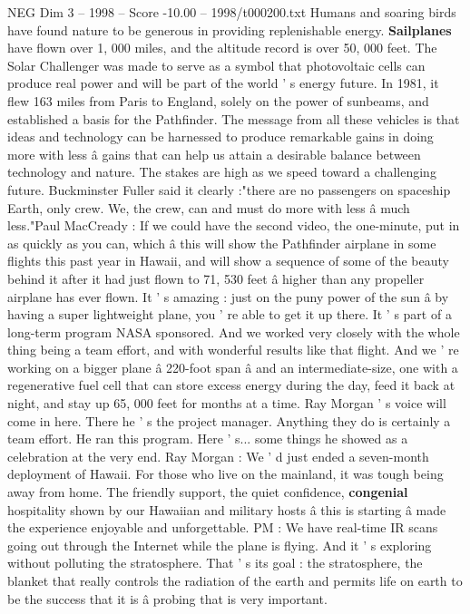 \begin{textsample}{NEG Dim 3 – 1998 – Score -10.00 – 1998/t000200.txt}
Humans and soaring birds have found nature to be generous in providing replenishable energy. \textbf{Sailplanes} have flown over 1, 000 miles, and the altitude record is over 50, 000 feet.
The Solar Challenger was made to serve as a symbol that photovoltaic cells can produce real power and will be part of the world ' s energy future.
In 1981, it flew 163 miles from Paris to England, solely on the power of sunbeams, and established a basis for the Pathfinder.
The message from all these vehicles is that ideas and technology can be harnessed to produce remarkable gains in doing more with less â gains that can help us attain a desirable balance between technology and nature.
The stakes are high as we speed toward a challenging future.
Buckminster Fuller said it clearly :"there are no passengers on spaceship Earth, only crew.
We, the crew, can and must do more with less â much less."Paul MacCready : If we could have the second video, the one-minute, put in as quickly as you can, which â this will show the Pathfinder airplane in some flights this past year in Hawaii, and will show a sequence of some of the beauty behind it after it had just flown to 71, 530 feet â higher than any propeller airplane has ever flown.
It ' s amazing : just on the puny power of the sun â by having a super lightweight plane, you ' re able to get it up there.
It ' s part of a long-term program NASA sponsored.
And we worked very closely with the whole thing being a team effort, and with wonderful results like that flight.
And we ' re working on a bigger plane â 220-foot span â and an intermediate-size, one with a regenerative fuel cell that can store excess energy during the day, feed it back at night, and stay up 65, 000 feet for months at a time.
Ray Morgan ' s voice will come in here.
There he ' s the project manager.
Anything they do is certainly a team effort.
He ran this program.
Here ' s... some things he showed as a celebration at the very end.
Ray Morgan : We ' d just ended a seven-month deployment of Hawaii.
For those who live on the mainland, it was tough being away from home.
The friendly support, the quiet confidence, \textbf{congenial} hospitality shown by our Hawaiian and military hosts â this is starting â made the experience enjoyable and unforgettable.
PM : We have real-time IR scans going out through the Internet while the plane is flying.
And it ' s exploring without polluting the stratosphere.
That ' s its goal : the stratosphere, the blanket that really controls the radiation of the earth and permits life on earth to be the success that it is â probing that is very important.

\end{textsample}

